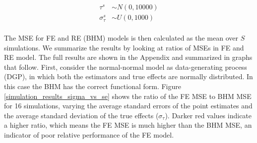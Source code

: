 \documentclass[12pt]{article}
\begin{document}


\begin{equation}
\begin{aligned}
\tau^s &\sim N(0, 10000) \\
\sigma_{\tau}^s &\sim U(0,1000) \\
\end{aligned}
\end{equation}




The MSE for FE and RE (BHM) models is then calculated as the mean over $S$ simulations. We summarize the results by looking at ratios of MSEs in FE and RE model. The full results are shown in the Appendix and summarized in graphs that follow. First, consider the  normal-normal model as data-generating process (DGP), in which both the estimators and true effects are normally distributed. In this case the BHM has the correct functional form. Figure \ref{simulation_results_sigma_vs_se} shows the ratio of the FE MSE to BHM MSE for 16 simulations, varying the average standard errors of the point estimates and the average standard deviation of the true effects ($\sigma_{\tau}$). Darker red values indicate a higher ratio, which means the FE MSE is much higher than the BHM MSE, an indicator of poor relative performance of the FE model.
\end{document}
